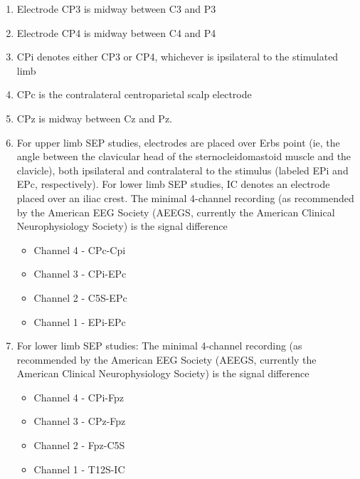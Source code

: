 \begin{enumerate}
  \item  Electrode CP3 is midway between C3 and P3
  
  \item Electrode CP4 is midway between C4 and P4
  
  \item CPi denotes either CP3 or CP4, whichever is ipsilateral to the
  stimulated limb
  
  \item CPc is the contralateral centroparietal scalp electrode
  
  \item CPz is midway between Cz and Pz.
  

  \item For upper limb SEP studies, electrodes are placed over Erbs point (ie, the angle
between the clavicular head of the sternocleidomastoid muscle and the clavicle),
both ipsilateral and contralateral to the stimulus (labeled EPi and EPc,
respectively). For lower limb SEP studies, IC denotes an electrode placed over
an iliac crest. The minimal 4-channel recording (as recommended by the American
EEG Society (AEEGS, currently the American Clinical Neurophysiology Society) is
the signal difference
\begin{itemize}
  \item  Channel 4 - CPc-Cpi
  \item  Channel 3 - CPi-EPc
  \item  Channel 2 - C5S-EPc
  \item  Channel 1 - EPi-EPc
\end{itemize}
    
    \item For lower limb SEP studies: The minimal 4-channel recording (as
    recommended by the American EEG Society (AEEGS, currently the American
    Clinical Neurophysiology Society) is the signal difference
    
 \begin{itemize} 
  \item  Channel 4 - CPi-Fpz
  \item  Channel 3 - CPz-Fpz
  \item  Channel 2 - Fpz-C5S
  \item  Channel 1 - T12S-IC
\end{itemize}   
 
\end{enumerate}



